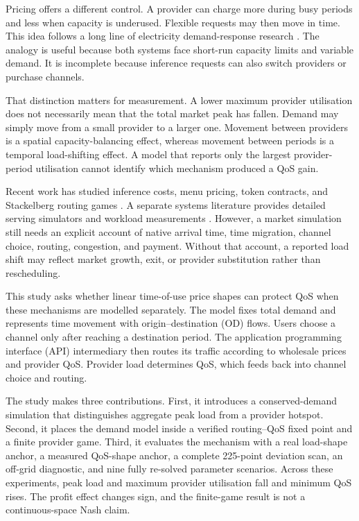 \documentclass[11pt,a4paper]{article}
\begin{document}
Pricing offers a different control. A provider can charge more during busy periods and less when capacity is underused. Flexible requests may then move in time. This idea follows a long line of electricity demand-response research \cite{schweppe1988spot,borenstein2005long,albadi2008summary,faruqui2010household,siano2014demand}. The analogy is useful because both systems face short-run capacity limits and variable demand. It is incomplete because inference requests can also switch providers or purchase channels.

That distinction matters for measurement. A lower maximum provider utilisation does not necessarily mean that the total market peak has fallen. Demand may simply move from a small provider to a larger one. Movement between providers is a spatial capacity-balancing effect, whereas movement between periods is a temporal load-shifting effect. A model that reports only the largest provider-period utilisation cannot identify which mechanism produced a QoS gain.

Recent work has studied inference costs, menu pricing, token contracts, and Stackelberg routing games \cite{demirer2025emerging,bergemann2025menu,guo2026prillm,yan2026stackelberg,cunningham2026token}. A separate systems literature provides detailed serving simulators and workload measurements \cite{agrawal2024vidur,wang2025burstgpt}. However, a market simulation still needs an explicit account of native arrival time, time migration, channel choice, routing, congestion, and payment. Without that account, a reported load shift may reflect market growth, exit, or provider substitution rather than rescheduling.

This study asks whether linear time-of-use price shapes can protect QoS when these mechanisms are modelled separately. The model fixes total demand and represents time movement with origin--destination (OD) flows. Users choose a channel only after reaching a destination period. The application programming interface (API) intermediary then routes its traffic according to wholesale prices and provider QoS. Provider load determines QoS, which feeds back into channel choice and routing.

The study makes three contributions. First, it introduces a conserved-demand simulation that distinguishes aggregate peak load from a provider hotspot. Second, it places the demand model inside a verified routing--QoS fixed point and a finite provider game. Third, it evaluates the mechanism with a real load-shape anchor, a measured QoS-shape anchor, a complete 225-point deviation scan, an off-grid diagnostic, and nine fully re-solved parameter scenarios. Across these experiments, peak load and maximum provider utilisation fall and minimum QoS rises. The profit effect changes sign, and the finite-game result is not a continuous-space Nash claim.
\end{document}
